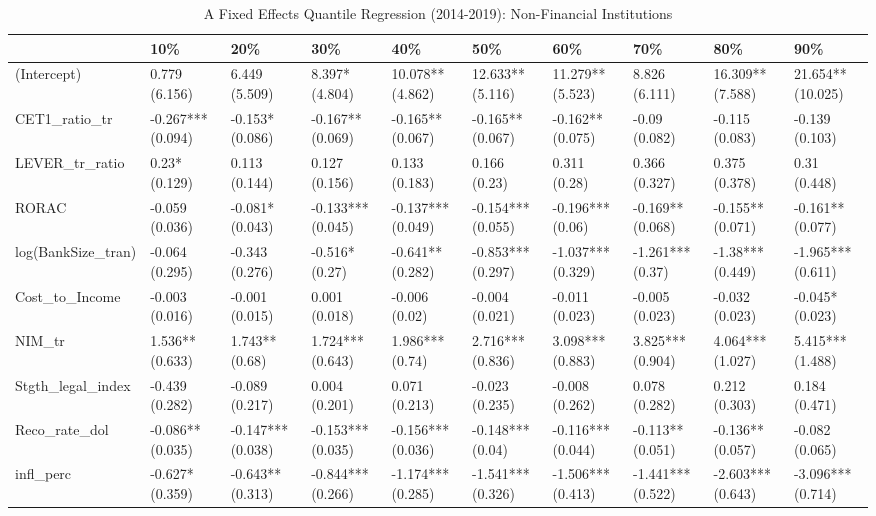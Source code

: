 \begin{table}[ht]
\centering
\caption{A Fixed Effects Quantile Regression (2014-2019): Non-Financial Institutions} 
\begingroup\small
\begin{tabular}{llllllllll}
  \toprule
 & 10\% & 20\% & 30\% & 40\% & 50\% & 60\% & 70\% & 80\% & 90\% \\ 
  \midrule
(Intercept) & 0.779 (6.156) & 6.449 (5.509) & 8.397* (4.804) & 10.078** (4.862) & 12.633** (5.116) & 11.279** (5.523) & 8.826 (6.111) & 16.309** (7.588) & 21.654** (10.025) \\ 
  CET1\_ratio\_tr & -0.267*** (0.094) & -0.153* (0.086) & -0.167** (0.069) & -0.165** (0.067) & -0.165** (0.067) & -0.162** (0.075) & -0.09 (0.082) & -0.115 (0.083) & -0.139 (0.103) \\ 
  LEVER\_tr\_ratio & 0.23* (0.129) & 0.113 (0.144) & 0.127 (0.156) & 0.133 (0.183) & 0.166 (0.23) & 0.311 (0.28) & 0.366 (0.327) & 0.375 (0.378) & 0.31 (0.448) \\ 
  RORAC & -0.059 (0.036) & -0.081* (0.043) & -0.133*** (0.045) & -0.137*** (0.049) & -0.154*** (0.055) & -0.196*** (0.06) & -0.169** (0.068) & -0.155** (0.071) & -0.161** (0.077) \\ 
  log(BankSize\_tran) & -0.064 (0.295) & -0.343 (0.276) & -0.516* (0.27) & -0.641** (0.282) & -0.853*** (0.297) & -1.037*** (0.329) & -1.261*** (0.37) & -1.38*** (0.449) & -1.965*** (0.611) \\ 
  Cost\_to\_Income & -0.003 (0.016) & -0.001 (0.015) & 0.001 (0.018) & -0.006 (0.02) & -0.004 (0.021) & -0.011 (0.023) & -0.005 (0.023) & -0.032 (0.023) & -0.045* (0.023) \\ 
  NIM\_tr & 1.536** (0.633) & 1.743** (0.68) & 1.724*** (0.643) & 1.986*** (0.74) & 2.716*** (0.836) & 3.098*** (0.883) & 3.825*** (0.904) & 4.064*** (1.027) & 5.415*** (1.488) \\ 
  Stgth\_legal\_index & -0.439 (0.282) & -0.089 (0.217) & 0.004 (0.201) & 0.071 (0.213) & -0.023 (0.235) & -0.008 (0.262) & 0.078 (0.282) & 0.212 (0.303) & 0.184 (0.471) \\ 
  Reco\_rate\_dol & -0.086** (0.035) & -0.147*** (0.038) & -0.153*** (0.035) & -0.156*** (0.036) & -0.148*** (0.04) & -0.116*** (0.044) & -0.113** (0.051) & -0.136** (0.057) & -0.082 (0.065) \\ 
  infl\_perc & -0.627* (0.359) & -0.643** (0.313) & -0.844*** (0.266) & -1.174*** (0.285) & -1.541*** (0.326) & -1.506*** (0.413) & -1.441*** (0.522) & -2.603*** (0.643) & -3.096*** (0.714) \\ 

\end{tabular}
\end{table}
